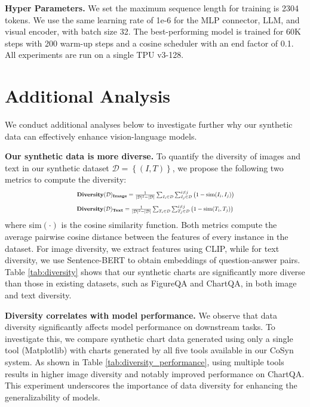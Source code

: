 \smallbreak
\noindent \textbf{Hyper Parameters.} We set the maximum sequence length for training is 2304 tokens. 
We use the same learning rate of 1e-6 for the MLP connector, LLM, and visual encoder, with batch size 32. 
The best-performing model is trained for 60K steps with 200 warm-up steps and a cosine scheduler with an end factor of 0.1. 
All experiments are run on a single TPU v3-128.

\section{Additional Analysis}
We conduct additional analyses below to investigate further why our synthetic data can effectively enhance vision-language models.

\smallbreak
\noindent \textbf{Our synthetic data is more diverse.} To quantify the diversity of images and text in our synthetic dataset $\mathcal{D} = \left\{\left(I, T\right)\right\}$, we propose the following two metrics to compute the diversity:
\vspace{-.3cm}
\begin{equation}
\scalebox{0.7}{$
    \text{\textbf{Diversity}}(\mathcal{D})_\text{\textbf{Image}} = \frac{1}{|\mathcal{D}|^2-|\mathcal{D}|} \sum_{I_i \in \mathcal{D}} \sum^{i \neq j}_{I_j \in \mathcal{D}} \left(1 - \text{sim}(I_i, I_j)\right)
$}
\end{equation}
\begin{equation}
\scalebox{0.7}{$
    \text{\textbf{Diversity}}(\mathcal{D})_\text{\textbf{Text}} = \frac{1}{|\mathcal{D}|^2-|\mathcal{D}|} \sum_{T_i \in \mathcal{D}} \sum^{i \neq j}_{T_j \in \mathcal{D}} \left(1 - \text{sim}(T_i, T_j)\right)
$}
\end{equation}
where sim$(\cdot)$ is the cosine similarity function. Both metrics compute the average pairwise cosine distance between the features of every instance in the dataset.
For image diversity, we extract features using CLIP, while for text diversity, we use Sentence-BERT \citep{reimers2019sentence} to obtain embeddings of question-answer pairs.
Table \ref{tab:diversity} shows that our synthetic charts are significantly more diverse than those in existing datasets, such as FigureQA and ChartQA, in both image and text diversity.



\smallbreak
\noindent \textbf{Diversity correlates with model performance.} We observe that data diversity significantly affects model performance on downstream tasks. 
To investigate this, we compare synthetic chart data generated using only a single tool (Matplotlib) with charts generated by all five tools available in our CoSyn system. 
As shown in Table \ref{tab:diversity_performance}, using multiple tools results in higher image diversity and notably improved performance on ChartQA. This experiment underscores the importance of data diversity for enhancing the generalizability of models.

